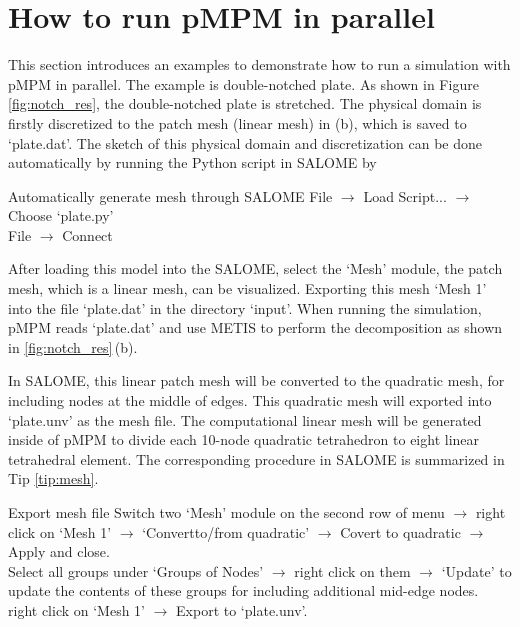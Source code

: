 \documentclass[10pt,a4paper]{article}
\begin{document}
\section{How to run pMPM in parallel}
\label{ch:exp}

This section introduces an examples to demonstrate how to run a simulation with pMPM in parallel. The example is double-notched plate. As shown in Figure \ref{fig:notch_res}, the double-notched plate is stretched. The physical domain is firstly discretized to the patch mesh (linear mesh) in (b), which is saved to `plate.dat'. The sketch of this physical domain and discretization can be done automatically by running the Python script in SALOME by 

\begin{tip}{Automatically generate mesh through SALOME}
File $\longrightarrow$ Load Script... $\longrightarrow$ Choose `plate.py' \\
File $\longrightarrow$ Connect 
\end{tip}
After loading this model into the SALOME, select the `Mesh' module, the patch mesh, which is a linear mesh, can be visualized. Exporting this mesh `Mesh 1' into the file `plate.dat' in the directory `input'. When running the simulation, pMPM reads `plate.dat' and use METIS to perform the decomposition as shown in \ref{fig:notch_res}\,(b). 

In SALOME, this linear patch mesh will be converted to the quadratic mesh, for including nodes at the middle of edges. This quadratic mesh will exported into `plate.unv' as the mesh file. The computational linear mesh will be generated inside of pMPM to divide each 10-node quadratic tetrahedron to eight linear tetrahedral element. The corresponding procedure in SALOME is summarized in Tip \ref{tip:mesh}.       

\begin{tip}[label=tip:mesh]{Export mesh file}
Switch two `Mesh' module on the second row of menu $\longrightarrow$ right click on `Mesh 1' $\longrightarrow$ `Convertto/from quadratic' $\longrightarrow$ 
Covert to quadratic $\longrightarrow$ Apply and close. \\
Select all groups under `Groups of Nodes' $\longrightarrow$ right click on them $\longrightarrow$ `Update' to update the contents of these groups for including additional mid-edge nodes.  \\
right click on `Mesh 1' $\longrightarrow$ Export to `plate.unv'.
\end{tip}
\end{document}
